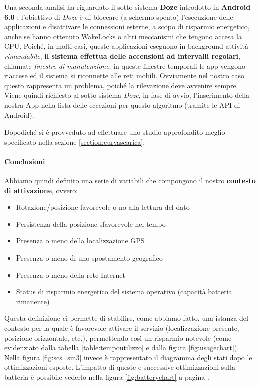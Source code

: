 \documentclass[a4paper,10pt]{memoir}
\begin{document}
Una seconda analisi ha riguardato il sotto-sistema \textbf{Doze} introdotto in \textbf{Android 6.0} \cite{doze}: l'obiettivo di \textit{Doze} è di bloccare (a schermo spento) l'esecuzione delle applicazioni e disattivare le connessioni esterne, a scopo di risparmio energetico, anche se hanno ottenuto WakeLocks o altri meccanismi che tengono accesa la CPU. Poiché, in molti casi, queste applicazioni eseguono in background attività \textit{rimandabile}, \textbf{il sistema effettua delle accensioni ad intervalli regolari}, chiamate \textit{finestre di manutenzione}: in queste finestre temporali le app vengono riaccese ed il sistema si riconnette alle reti mobili. Ovviamente nel nostro caso questo rappresenta un problema, poiché la rilevazione deve avvenire sempre. Viene quindi richiesto al sotto-sistema \textit{Doze}, in fase di avvio, l'inserimento della nostra App nella lista delle eccezioni per questo algoritmo (tramite le API di Android).

Dopodiché si è provveduto ad effettuare uno studio approfondito meglio specificato nella sezione \ref{section:curvascarica}.

\paragraph{Conclusioni} Abbiamo quindi definito una serie di variabili che compongono il nostro \textbf{contesto di attivazione}, ovvero:

\begin{itemize}
\item Rotazione/posizione favorevole o no alla lettura del dato
\item Persistenza della posizione sfavorevole nel tempo
\item Presenza o meno della localizzazione GPS
\item Presenza o meno di uno spostamento geografico
\item Presenza o meno della rete Internet
\item Status di risparmio energetico del sistema operativo (capacità batteria rimanente)
\end{itemize}

Questa definizione ci permette di stabilire, come abbiamo fatto, una istanza del contesto per la quale è favorevole attivare il servizio (localizzazione presente, posizione orizzontale, etc.), permettendo così un risparmio notevole (come evidenziato dalla tabella \ref{table:tempoutilizzo} e dalla figura \ref{fig:usagechart}). Nella figura \ref{fig:scs_sm3} invece è rappresentato il diagramma degli stati dopo le ottimizzazioni esposte. L'impatto di queste e successive ottimizzazioni sulla batteria è possibile vederlo nella figura \ref{fig:batterychart} a pagina \pageref{fig:batterychart}.
\end{document}
